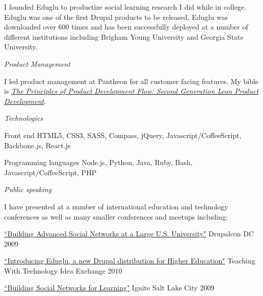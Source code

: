 \documentclass[11pt]{article}
\newenvironment{mydescription}
{ \begin{description}
    \setlength{\itemsep}{0pt}
    \setlength{\parskip}{0pt}
    \setlength{\parsep}{0pt}     }
{ \end{description}                  }
\begin{document}
\bigskip


\noindent I founded Eduglu to productize social learning research I did while in college. Eduglu was one of the first Drupal products to be released. Eduglu was downloaded over 600 times and has been successfully deployed at a number of different institutions including Brigham Young University and Georgia State University.

\newpage

\medskip

\noindent\emph{Product Management}

\medskip

\noindent I led product management at Pantheon for all customer facing features. My bible is \emph{\href{http://www.amazon.com/The-Principles-Product-Development-Flow/dp/1935401009/}{The Principles of Product Development Flow: Second Generation Lean Product Development}}.

\bigskip
\medskip

\noindent\emph{Technologies}

\medskip

\begin{mydescription}
  \item[Front end] HTML5, CSS3, SASS, Compass, jQuery, Javascript/CoffeeScript, Backbone.js, React.js
  \item[Programming languages] Node.js, Python, Java, Ruby, Bash, Javascript/CoffeeScript, PHP
\end{mydescription}

\bigskip

\noindent\emph{Public speaking}

\medskip

\noindent I have presented at a number of international education and technology conferences as well as many smaller conferences and meetups including:

\medskip

\begin{mydescription}
  \item[\href{http://www.archive.org/details/DrupalconDc2009-BuildingAdvancedSocialNetworksAtALargeU.s.University}{``Building Advanced Social Networks at a Large U.S. University"}] Drupalcon DC 2009
  \item[\href{http://ttix.org/archives/2010-sessions/introducing-eduglu-a-new-drupal-distribution-for-higher-education/}{``Introducing Eduglu, a new Drupal distribution for Higher Education"}] Teaching With Technology Idea Exchange 2010
  \item[\href{http://www.ignitesaltlake.com/ignite/index.cfm/videos/ignite-salt-lake-2/}{``Building Social Networks for Learning"}] Ignite Salt Lake City 2009
\end{mydescription}
\end{document}
